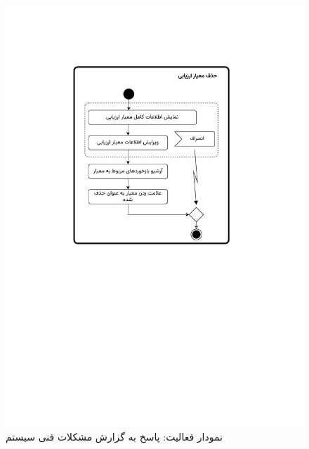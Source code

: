 \begin{figure}[ht!]
	\centering
	\includegraphics[scale=0.8, page=4]{figs/OOD-activity31-35.pdf}
	\caption{نمودار فعالیت: پاسخ به گزارش مشکلات فنی سیستم}
\end{figure}
\FloatBarrier
\newpage



